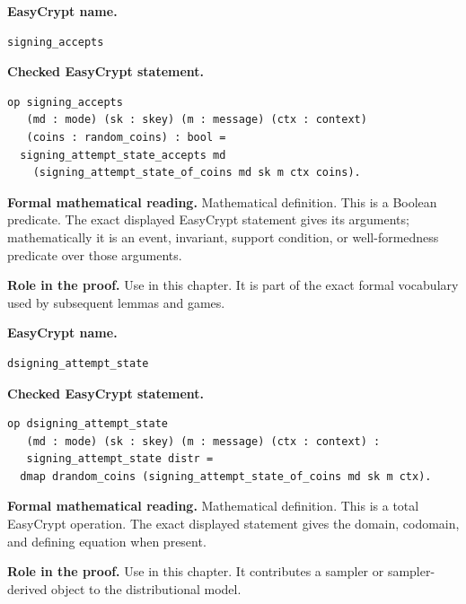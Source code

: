 \begin{formaldefinition}
\noindent\textbf{EasyCrypt name.}
\begin{lstlisting}[language=EasyCrypt,basicstyle=\ttfamily\scriptsize]
signing_accepts
\end{lstlisting}
\noindent\textbf{Checked EasyCrypt statement.}
\begin{lstlisting}[language=EasyCrypt,basicstyle=\ttfamily\scriptsize]
op signing_accepts
   (md : mode) (sk : skey) (m : message) (ctx : context)
   (coins : random_coins) : bool =
  signing_attempt_state_accepts md
    (signing_attempt_state_of_coins md sk m ctx coins).
\end{lstlisting}
\noindent\textbf{Formal mathematical reading.}
Mathematical definition. This is a Boolean predicate.  The exact displayed EasyCrypt statement gives its arguments; mathematically it is an event, invariant, support condition, or well-formedness predicate over those arguments.

\noindent\textbf{Role in the proof.}
Use in this chapter. It is part of the exact formal vocabulary used by subsequent lemmas and games.

\end{formaldefinition}

\begin{formaldefinition}
\noindent\textbf{EasyCrypt name.}
\begin{lstlisting}[language=EasyCrypt,basicstyle=\ttfamily\scriptsize]
dsigning_attempt_state
\end{lstlisting}
\noindent\textbf{Checked EasyCrypt statement.}
\begin{lstlisting}[language=EasyCrypt,basicstyle=\ttfamily\scriptsize]
op dsigning_attempt_state
   (md : mode) (sk : skey) (m : message) (ctx : context) :
   signing_attempt_state distr =
  dmap drandom_coins (signing_attempt_state_of_coins md sk m ctx).
\end{lstlisting}
\noindent\textbf{Formal mathematical reading.}
Mathematical definition. This is a total EasyCrypt operation.  The exact displayed statement gives the domain, codomain, and defining equation when present.

\noindent\textbf{Role in the proof.}
Use in this chapter. It contributes a sampler or sampler-derived object to the distributional model.

\end{formaldefinition}

